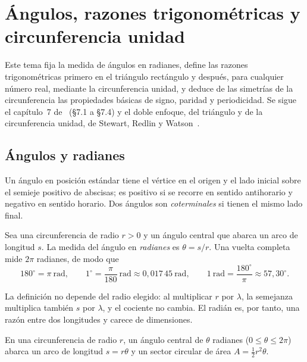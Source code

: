 \chapter{Ángulos, razones trigonométricas y circunferencia unidad}
\label{tema:1}

Este tema fija la medida de ángulos en radianes, define las razones trigonométricas primero en el triángulo rectángulo y después, para cualquier número real, mediante la circunferencia unidad, y deduce de las simetrías de la circunferencia las propiedades básicas de signo, paridad y periodicidad. Se sigue el capítulo~7 de~\cite{osat} (§7.1 a §7.4) y el doble enfoque, del triángulo y de la circunferencia unidad, de Stewart, Redlin y Watson~\cite{stewart}.

\section{Ángulos y radianes}

Un ángulo en posición estándar tiene el vértice en el origen y el lado inicial sobre el semieje positivo de abscisas; es positivo si se recorre en sentido antihorario y negativo en sentido horario. Dos ángulos son \emph{coterminales} si tienen el mismo lado final.

\begin{definicion}[Radián]\label{def:radian}
Sea una circunferencia de radio $r>0$ y un ángulo central que abarca un arco de longitud $s$. La medida del ángulo en \emph{radianes} es $\theta=s/r$. Una vuelta completa mide $2\pi$ radianes, de modo que
\[
180^{\circ}=\pi\ \text{rad},\qquad 1^{\circ}=\frac{\pi}{180}\ \text{rad}\approx 0{,}017\,45\ \text{rad},\qquad 1\ \text{rad}=\frac{180^{\circ}}{\pi}\approx 57{,}30^{\circ}.
\]
\end{definicion}

La definición no depende del radio elegido: al multiplicar $r$ por $\lambda$, la semejanza multiplica también $s$ por $\lambda$, y el cociente no cambia. El radián es, por tanto, una razón entre dos longitudes y carece de dimensiones.

\begin{proposicion}\label{prop:arco-sector}
En una circunferencia de radio $r$, un ángulo central de $\theta$ radianes ($0\le\theta\le 2\pi$) abarca un arco de longitud $s=r\theta$ y un sector circular de área $A=\tfrac12 r^{2}\theta$.
\end{proposicion}

